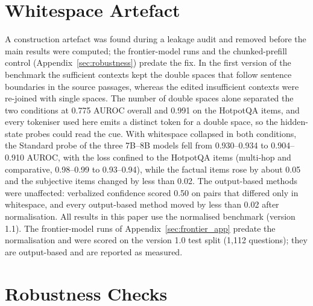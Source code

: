 \documentclass[acmsmall,screen,review]{acmart}
\begin{document}
\section{Whitespace Artefact}
\label{sec:whitespace}
A construction artefact was found during a leakage audit and removed before the main results were computed; the frontier-model runs and the chunked-prefill control (Appendix~\ref{sec:robustness}) predate the fix. In the first version of the benchmark the sufficient contexts kept the double spaces that follow sentence boundaries in the source passages, whereas the edited insufficient contexts were re-joined with single spaces. The number of double spaces alone separated the two conditions at 0.775 AUROC overall and 0.991 on the HotpotQA items, and every tokeniser used here emits a distinct token for a double space, so the hidden-state probes could read the cue. With whitespace collapsed in both conditions, the Standard probe of the three 7B--8B models fell from 0.930--0.934 to 0.904--0.910 AUROC, with the loss confined to the HotpotQA items (multi-hop and comparative, 0.98--0.99 to 0.93--0.94), while the factual items rose by about 0.05 and the subjective items changed by less than 0.02. The output-based methods were unaffected: verbalized confidence scored 0.50 on pairs that differed only in whitespace, and every output-based method moved by less than 0.02 after normalisation. All results in this paper use the normalised benchmark (version 1.1). The frontier-model runs of Appendix~\ref{sec:frontier_app} predate the normalisation and were scored on the version 1.0 test split (1,112 questions); they are output-based and are reported as measured.

\section{Robustness Checks}
\end{document}

